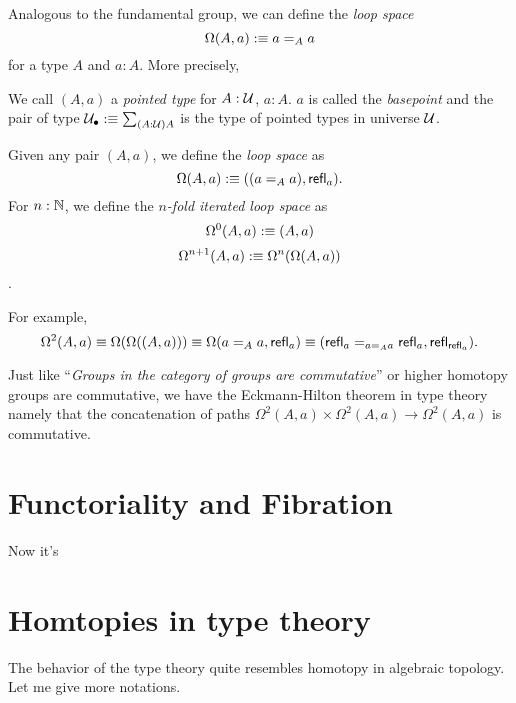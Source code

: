 Analogous to the fundamental group, we can define the {\it loop space} 
$$\Omega(A, a):\equiv a=_Aa$$ for a type $A$ and $a: A$. More precisely,

\newcommand{\pointed}{_\bullet}
\begin{definition}
    We call $(A, a)$ a {\it pointed type} for $A:\mathcal{U}$, $a:A$.
    $a$ is called the {\it basepoint} and the pair of type 
    $\universe\pointed\defn\sum_{(A:\universe)A}$ is the type of pointed 
    types in universe $\mathcal{U}$.
\end{definition}

\begin{definition}
    Given any pair $(A, a)$, we define the {\it loop space} as 
    $$ \Omega(A,a):\equiv ((a=_A a),\text{\sf refl}_a).$$
    For $n:\mathbb{N}$, we define the {\it$n$-fold iterated loop space} as
    $$\Omega^0(A,a):\equiv(A,a)$$
    $$\Omega^{n+1}(A,a):\equiv\Omega^n(\Omega(A, a))$$.
\end{definition}

For example, 
$$
    \Omega^2(A,a)\equiv\Omega(\Omega((A,a)))\equiv\Omega(a=_Aa,\text{\sf refl}_a)
    \equiv(\text{\sf refl}_a=_{a=_Aa}\text{\sf refl}_a, \text{\sf refl}_{\text{\sf refl}_a}).
$$

Just like ``{\it Groups in the category of groups are commutative}''
\cite{cat-awodey} or higher homotopy groups are commutative, we have
the Eckmann-Hilton theorem in type theory namely that the concatenation of 
paths $\Omega^2(A,a)\times\Omega^2(A,a)\to\Omega^2(A,a)$ is commutative.


\section{Functoriality and Fibration}

Now it's

\section{Homtopies in type theory}

The behavior of the type theory quite resembles homotopy in algebraic
topology. Let me give more notations.

